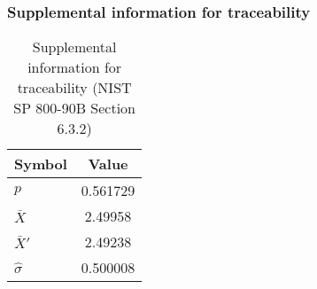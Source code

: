 \documentclass[a3paper,xelatex,english]{bxjsarticle}
\begin{document}
\subsubsection{Supplemental information for traceability}
\renewcommand{\arraystretch}{1.8}
\begin{table}[h]
\caption{Supplemental information for traceability (NIST SP 800-90B Section 6.3.2)}
\begin{center}
\begin{tabular}{|l|c|}
\hline 
\rowcolor{anotherlightblue} %
Symbol				& Value \\ \hline 
$p$				& 0.561729\\ \hline 
$\bar{X}$ 		&  2.49958\\ \hline
$\bar{X}'$		&  2.49238\\ \hline
$\hat{\sigma}$		& 0.500008\\ \hline
\end{tabular}
\end{center}
\end{table}
\renewcommand{\arraystretch}{1.4}
\clearpage
\end{document}

